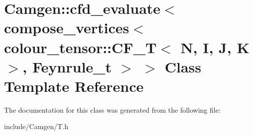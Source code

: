 \hypertarget{a00048}{}\section{Camgen\+:\+:cfd\+\_\+evaluate$<$ compose\+\_\+vertices$<$ colour\+\_\+tensor\+:\+:C\+F\+\_\+\+T$<$ N, I, J, K $>$, Feynrule\+\_\+t $>$ $>$ Class Template Reference}
\label{a00048}


The documentation for this class was generated from the following file\+:\begin{DoxyCompactItemize}
\item 
include/\+Camgen/T.\+h\end{DoxyCompactItemize}
